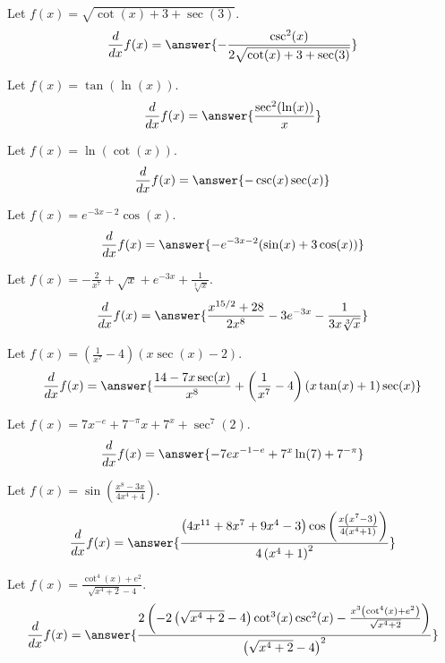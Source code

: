 \documentclass{ximera}
\begin{document}
\begin{shuffle}
\begin{exercise}
Let $f(x)=\sqrt{\cot (x)+3+\sec (3)}$.
\[
\ddx f(x) = \answer{-\frac{\csc ^2(x)}{2 \sqrt{\cot (x)+3+\sec (3)}}}
\]
\end{exercise}

\begin{exercise}
Let $f(x)=\tan (\ln (x))$.
\[
\ddx f(x) = \answer{\frac{\sec ^2(\ln (x))}{x}}
\]
\end{exercise}

\begin{exercise}
Let $f(x)=\ln (\cot (x))$.
\[
\ddx f(x) = \answer{-\csc (x) \sec (x)}
\]
\end{exercise}

\begin{exercise}
Let $f(x)=e^{-3 x-2} \cos (x)$.
\[
\ddx f(x) = \answer{-e^{-3 x-2} (\sin (x)+3 \cos (x))}
\]
\end{exercise}

\begin{exercise}
Let $f(x)=-\frac{2}{x^7}+\sqrt{x}+e^{-3 x}+\frac{1}{\sqrt[3]{x}}$.
\[
\ddx f(x) = \answer{\frac{x^{15/2}+28}{2 x^8}-3 e^{-3 x}-\frac{1}{3 x \sqrt[3]{x}}}
\]
\end{exercise}

\begin{exercise}
Let $f(x)=\left(\frac{1}{x^7}-4\right) (x \sec (x)-2)$.
\[
\ddx f(x) = \answer{\frac{14-7 x \sec (x)}{x^8}+\left(\frac{1}{x^7}-4\right) (x \tan (x)+1) \sec (x)}
\]
\end{exercise}

\begin{exercise}
Let $f(x)=7 x^{-e}+7^{-\pi } x+7^x+\sec ^7(2)$.
\[
\ddx f(x) = \answer{-7 e x^{-1-e}+7^x \ln (7)+7^{-\pi }}
\]
\end{exercise}

\begin{exercise}
Let $f(x)=\sin \left(\frac{x^8-3 x}{4 x^4+4}\right)$.
\[
\ddx f(x) = \answer{\frac{\left(4 x^{11}+8 x^7+9 x^4-3\right) \cos \left(\frac{x \left(x^7-3\right)}{4 \left(x^4+1\right)}\right)}{4 \left(x^4+1\right)^2}}
\]
\end{exercise}

\begin{exercise}
Let $f(x)=\frac{\cot ^4(x)+e^2}{\sqrt{x^4+2}-4}$.
\[
\ddx f(x) = \answer{\frac{2 \left(-2 \left(\sqrt{x^4+2}-4\right) \cot ^3(x) \csc ^2(x)-\frac{x^3 \left(\cot ^4(x)+e^2\right)}{\sqrt{x^4+2}}\right)}{\left(\sqrt{x^4+2}-4\right)^2}}
\]
\end{exercise}


\end{shuffle}
\end{document}
